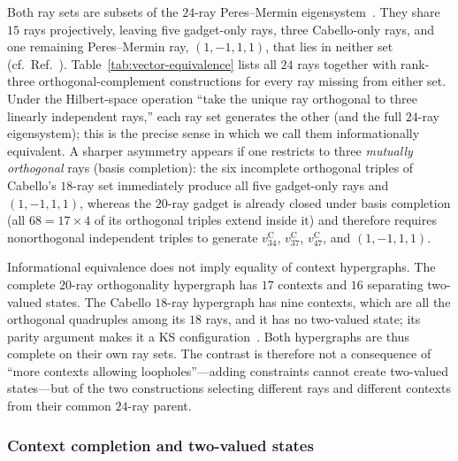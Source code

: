 \documentclass[%
  reprint,
  superscriptaddress,
  showkeys,
  amsmath,amssymb,
  aps,pra,
  longbibliography,
  floatfix,
  x11names
]{revtex4-2}
\begin{document}
Both ray sets are subsets of the $24$-ray Peres--Mermin eigensystem~\cite{pavicic-2004ksafq,svozil-2024-convert-pra-externalfigures,2024-cabello-trandafir0}.  They share $15$ rays projectively, leaving five gadget-only rays, three Cabello-only rays, and one remaining Peres--Mermin ray, $(1,-1,1,1)$, that lies in neither set (cf.\ Ref.~\cite[Table~III]{2024-cabello-trandafir0}).  Table~\ref{tab:vector-equivalence} lists all $24$ rays together with rank-three orthogonal-complement constructions for every ray missing from either set.  Under the Hilbert-space operation ``take the unique ray orthogonal to three linearly independent rays,'' each ray set generates the other (and the full $24$-ray eigensystem); this is the precise sense in which we call them informationally equivalent.  A sharper asymmetry appears if one restricts to three \emph{mutually orthogonal} rays (basis completion): the six incomplete orthogonal triples of Cabello's $18$-ray set immediately produce all five gadget-only rays and $(1,-1,1,1)$, whereas the $20$-ray gadget is already closed under basis completion (all $68=17\times 4$ of its orthogonal triples extend inside it) and therefore requires nonorthogonal independent triples to generate $v^{\mathrm{C}}_{34}$, $v^{\mathrm{C}}_{37}$, $v^{\mathrm{C}}_{47}$, and $(1,-1,1,1)$.

Informational equivalence does not imply equality of context hypergraphs.  The complete $20$-ray orthogonality hypergraph has $17$ contexts and $16$ separating two-valued states.  The Cabello $18$-ray hypergraph has nine contexts, which are all the orthogonal quadruples among its $18$ rays, and it has no two-valued state; its parity argument makes it a KS configuration~\cite{cabello-96}.  Both hypergraphs are thus complete on their own ray sets.  The contrast is therefore not a consequence of ``more contexts allowing loopholes''---adding constraints cannot create two-valued states---but of the two constructions selecting different rays and different contexts from their common $24$-ray parent.

\subsubsection{Context completion and two-valued states}
\end{document}
